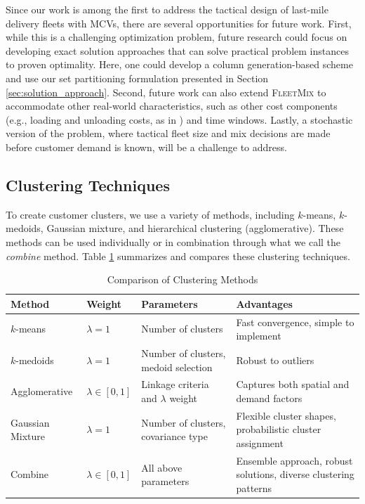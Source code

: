 \documentclass[11pt]{elsarticle}
\theoremstyle{plain}
\begin{document}
Since our work is among the first to address the tactical design of last-mile delivery fleets with \acp{MCV}, there are several opportunities for future work. 
First, while this is a challenging optimization problem, future research could focus on developing exact solution approaches that can solve practical problem instances to proven optimality. Here, one could develop a column generation-based scheme and use our set partitioning formulation presented in Section \ref{sec:solution_approach}.
Second, future work can also extend \textsc{FleetMix} to accommodate other real-world characteristics, such as other cost components (e.g., loading and unloading costs, as in \cite{hubner2019multi}) and time windows.
Lastly, a stochastic version of the problem, where tactical fleet size and mix decisions are made before customer demand is known, will be a challenge to address.




\newpage
\begin{appendix}
\section{Clustering Techniques} \label{app:data:clustering}

To create customer clusters, we use a variety of methods, including $k$-means, $k$-medoids, Gaussian mixture, and hierarchical clustering (agglomerative). These methods can be used individually or in combination through what we call the \emph{combine} method. Table \ref{tab:clustering-methods} summarizes and compares these clustering techniques.

\begin{table}[h]
\centering
\renewcommand{\arraystretch}{1.3}
\caption{Comparison of Clustering Methods}
\begin{tabularx}{\textwidth}{p{3.5cm} p{2cm} p{3.5cm} X}
\toprule
Method & Weight & Parameters & Advantages \\
\midrule
$k$-means & $\lambda = 1$ & Number of clusters & Fast convergence, simple to implement \\
$k$-medoids & $\lambda = 1$ & Number of clusters, medoid selection & Robust to outliers \\
Agglomerative & $\lambda \in [0,1]$ & Linkage criteria and $\lambda$ weight & Captures both spatial and demand factors \\
Gaussian Mixture & $\lambda = 1$ & Number of clusters, covariance type & Flexible cluster shapes, probabilistic cluster assignment \\
Combine & $\lambda \in [0,1]$ & All above parameters & Ensemble approach, robust solutions, diverse clustering patterns \\
\bottomrule
\end{tabularx}

\label{tab:clustering-methods}
\end{table}

\end{appendix}
\end{document}

